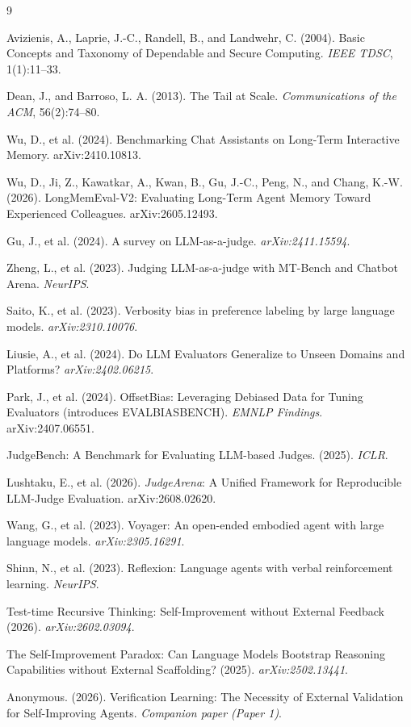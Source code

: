 \documentclass[11pt]{article}
\begin{document}
\begin{thebibliography}{9}\setlength{\itemsep}{-2pt}

Avizienis, A., Laprie, J.-C., Randell, B., and Landwehr, C. (2004). Basic
Concepts and Taxonomy of Dependable and Secure Computing. \emph{IEEE TDSC},
1(1):11--33.

Dean, J., and Barroso, L. A. (2013). The Tail at Scale. \emph{Communications
of the ACM}, 56(2):74--80.

Wu, D., et al. (2024). Benchmarking Chat Assistants on Long-Term Interactive
Memory. arXiv:2410.10813.

Wu, D., Ji, Z., Kawatkar, A., Kwan, B., Gu, J.-C., Peng, N., and Chang, K.-W.
(2026). LongMemEval-V2: Evaluating Long-Term Agent Memory Toward Experienced
Colleagues. arXiv:2605.12493.

Gu, J., et al. (2024). A survey on LLM-as-a-judge. \emph{arXiv:2411.15594}.

Zheng, L., et al. (2023). Judging LLM-as-a-judge with MT-Bench and Chatbot Arena. \emph{NeurIPS}.

Saito, K., et al. (2023). Verbosity bias in preference labeling by large language models. \emph{arXiv:2310.10076}.

Liusie, A., et al. (2024). Do LLM Evaluators Generalize to Unseen Domains and Platforms? \emph{arXiv:2402.06215}.

Park, J., et al. (2024). OffsetBias: Leveraging Debiased Data for Tuning Evaluators (introduces EVALBIASBENCH). \emph{EMNLP Findings}. arXiv:2407.06551.

JudgeBench: A Benchmark for Evaluating LLM-based Judges. (2025). \emph{ICLR}.

Lushtaku, E., et al. (2026). \emph{JudgeArena}: A Unified Framework for Reproducible
LLM-Judge Evaluation. arXiv:2608.02620.

Wang, G., et al. (2023). Voyager: An open-ended embodied agent with large language models. \emph{arXiv:2305.16291}.

Shinn, N., et al. (2023). Reflexion: Language agents with verbal reinforcement learning. \emph{NeurIPS}.

Test-time Recursive Thinking: Self-Improvement without External Feedback (2026). \emph{arXiv:2602.03094}.

The Self-Improvement Paradox: Can Language Models Bootstrap Reasoning Capabilities without External Scaffolding? (2025). \emph{arXiv:2502.13441}.

Anonymous. (2026). Verification Learning: The Necessity of External Validation for Self-Improving Agents. \emph{Companion paper (Paper 1)}.

\end{thebibliography}
\end{document}
